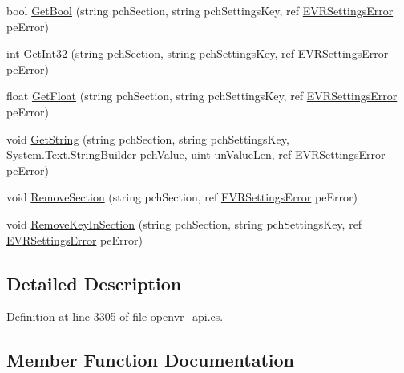 \begin{DoxyCompactItemize}
bool \mbox{\hyperlink{class_valve_1_1_v_r_1_1_c_v_r_settings_a8b9e139d3dd79ec4c75af4993979b01c}{Get\+Bool}} (string pch\+Section, string pch\+Settings\+Key, ref \mbox{\hyperlink{namespace_valve_1_1_v_r_aeab7722b211afc3885ed77faa931291f}{E\+V\+R\+Settings\+Error}} pe\+Error)
\item 
int \mbox{\hyperlink{class_valve_1_1_v_r_1_1_c_v_r_settings_ae2d7aa36ff2a62584ceacdf868162a3e}{Get\+Int32}} (string pch\+Section, string pch\+Settings\+Key, ref \mbox{\hyperlink{namespace_valve_1_1_v_r_aeab7722b211afc3885ed77faa931291f}{E\+V\+R\+Settings\+Error}} pe\+Error)
\item 
float \mbox{\hyperlink{class_valve_1_1_v_r_1_1_c_v_r_settings_a8537b41839f28189017706e73163a2cc}{Get\+Float}} (string pch\+Section, string pch\+Settings\+Key, ref \mbox{\hyperlink{namespace_valve_1_1_v_r_aeab7722b211afc3885ed77faa931291f}{E\+V\+R\+Settings\+Error}} pe\+Error)
\item 
void \mbox{\hyperlink{class_valve_1_1_v_r_1_1_c_v_r_settings_ac27965939d598a96e3a03ed59544c5a6}{Get\+String}} (string pch\+Section, string pch\+Settings\+Key, System.\+Text.\+String\+Builder pch\+Value, uint un\+Value\+Len, ref \mbox{\hyperlink{namespace_valve_1_1_v_r_aeab7722b211afc3885ed77faa931291f}{E\+V\+R\+Settings\+Error}} pe\+Error)
\item 
void \mbox{\hyperlink{class_valve_1_1_v_r_1_1_c_v_r_settings_a8095ef6c041dabd93703e782d038e7a5}{Remove\+Section}} (string pch\+Section, ref \mbox{\hyperlink{namespace_valve_1_1_v_r_aeab7722b211afc3885ed77faa931291f}{E\+V\+R\+Settings\+Error}} pe\+Error)
\item 
void \mbox{\hyperlink{class_valve_1_1_v_r_1_1_c_v_r_settings_ac304347cb817ba4d3418059cf7d99bb4}{Remove\+Key\+In\+Section}} (string pch\+Section, string pch\+Settings\+Key, ref \mbox{\hyperlink{namespace_valve_1_1_v_r_aeab7722b211afc3885ed77faa931291f}{E\+V\+R\+Settings\+Error}} pe\+Error)
\end{DoxyCompactItemize}


\subsection{Detailed Description}


Definition at line 3305 of file openvr\+\_\+api.\+cs.



\subsection{Member Function Documentation}
\mbox{\label{class_valve_1_1_v_r_1_1_c_v_r_settings_a8b9e139d3dd79ec4c75af4993979b01c}} 
